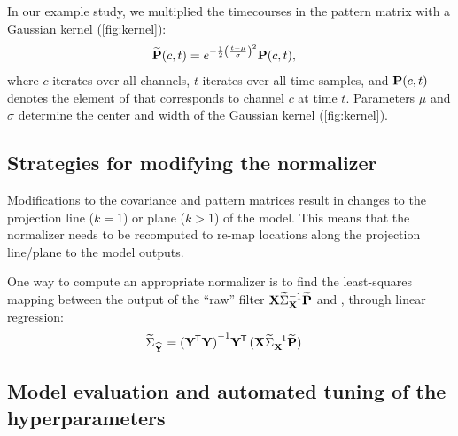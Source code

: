 \documentclass[a4paper]{vanvliet_paper}
\newcommand{\modcov}{\widetilde{\Sigma}_{\mat{X}}}
\newcommand{\modpat}{\widetilde{\mat{P}}}
\newcommand{\modnorm}{\widetilde{\Sigma}_{\emat{Y}}}
\begin{document}
In our example study, we multiplied the timecourses in the pattern matrix with a Gaussian kernel (\autoref{fig:kernel}):
\begin{align}
    \modpat(c,t) &= e^{-\frac{1}{2} {\left(\frac{t - \mu}{\sigma}\right)}^2} \mat{P}(c,t),
\end{align}
where $c$ iterates over all channels, $t$ iterates over all time samples, and $\mathbf{P}(c,t)$ denotes the element of  that corresponds to channel $c$ at time $t$.
Parameters $\mu$ and $\sigma$ determine the center and width of the Gaussian kernel (\autoref{fig:kernel}).


\subsection{Strategies for modifying the normalizer}\label{sec:modnorm}

Modifications to the covariance and pattern matrices result in changes to the projection line ($k=1$) or plane ($k>1$) of the model.
This means that the normalizer needs to be recomputed to re-map locations along the projection line/plane to the model outputs.

One way to compute an appropriate normalizer is to find the least-squares mapping between the output of the ``raw'' filter $\mat{X}\modcov^{-1}\modpat$ and , through linear regression:
\begin{align}
    \modnorm &= {(\mat{Y}\trans\mat{Y})}^{-1} \mat{Y}\trans \, (\mat{X}\modcov^{-1}\modpat)
\end{align}

\subsection{Model evaluation and automated tuning of the hyperparameters}\label{sec:tuning}
\end{document}
